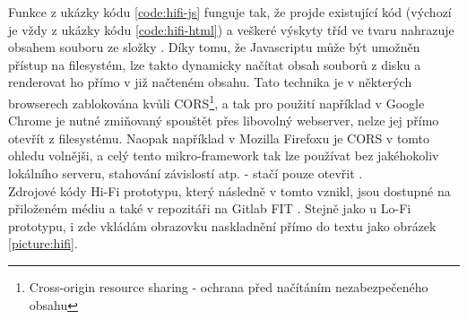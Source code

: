 Funkce  z ukázky kódu \ref{code:hifi-js} funguje tak, že projde existující kód (výchozí je vždy  z ukázky kódu \ref{code:hifi-html}) a veškeré výskyty tříd ve tvaru  nahrazuje obsahem souboru  ze složky . Díky tomu, že Javascriptu může být umožněn přístup na filesystém, lze takto dynamicky načítat obsah souborů z disku a renderovat ho přímo v již načteném obsahu. Tato technika je v některých browserech zablokována kvůli CORS\footnote{Cross-origin resource sharing - ochrana před načítáním nezabezpečeného obsahu}, a tak pro použití například v Google Chrome je nutné zmiňovaný  spouštět přes libovolný webserver, nelze jej přímo otevřít z filesystému. Naopak například v Mozilla Firefoxu je CORS v tomto ohledu volnějši, a celý tento mikro-framework tak lze používat bez jakéhokoliv lokálního serveru, stahování závislostí atp. - stačí pouze otevřit .\\
Zdrojové kódy Hi-Fi prototypu, který následně v tomto  vznikl, jsou dostupné na přiloženém médiu a také v repozitáři na Gitlab FIT \cite{gitlab-hifi}. Stejně jako u Lo-Fi prototypu, i zde vkládám obrazovku naskladnění přímo do textu jako obrázek \ref{picture:hifi}.\\

